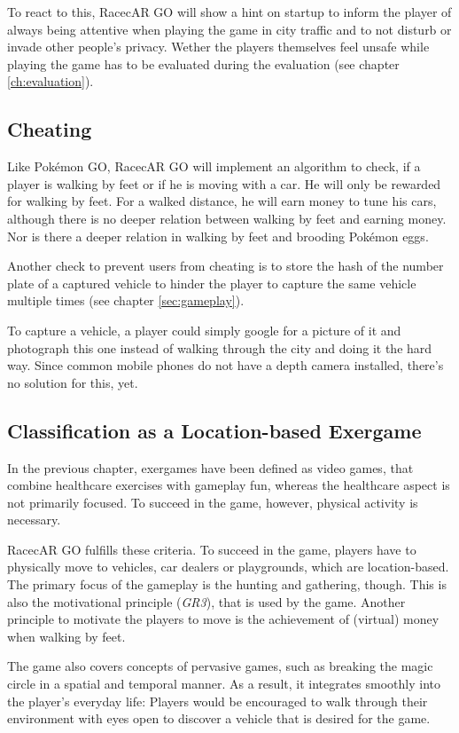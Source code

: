 To react to this, RacecAR GO will show a hint on startup to inform the player of always being attentive when playing the game in city traffic and to not disturb or invade other people's privacy. Wether the players themselves feel unsafe while playing the game has to be evaluated during the evaluation (see chapter \ref{ch:evaluation}).

\subsection{Cheating}
Like Pok\'{e}mon GO, RacecAR GO will implement an algorithm to check, if a player is walking by feet or if he is moving with a car. He will only be rewarded for walking by feet. For a walked distance, he will earn money to tune his cars, although there is no deeper relation between walking by feet and earning money. Nor is there a deeper relation in walking by feet and brooding Pok\'{e}mon eggs.

Another check to prevent users from cheating is to store the hash of the number plate of a captured vehicle to hinder the player to capture the same vehicle multiple times (see chapter \ref{sec:gameplay}).

To capture a vehicle, a player could simply google for a picture of it and photograph this one instead of walking through the city and doing it the hard way. Since common mobile phones do not have a depth camera installed, there's no solution for this, yet.

\subsection{Classification as a Location-based Exergame}
In the previous chapter, exergames have been defined as video games, that combine healthcare exercises with gameplay fun, whereas the healthcare aspect is not primarily focused. To succeed in the game, however, physical activity is necessary.

RacecAR GO fulfills these criteria. To succeed in the game, players have to physically move to vehicles, car dealers or playgrounds, which are location-based. The primary focus of the gameplay is the hunting and gathering, though. This is also the motivational principle (\emph{GR3}), that is used by the game. Another principle to motivate the players to move is the achievement of (virtual) money when walking by feet.

The game also covers concepts of pervasive games, such as breaking the magic circle in a spatial and temporal manner. As a result, it integrates smoothly into the player's everyday life: Players would be encouraged to walk through their environment with eyes open to discover a vehicle that is desired for the game.


